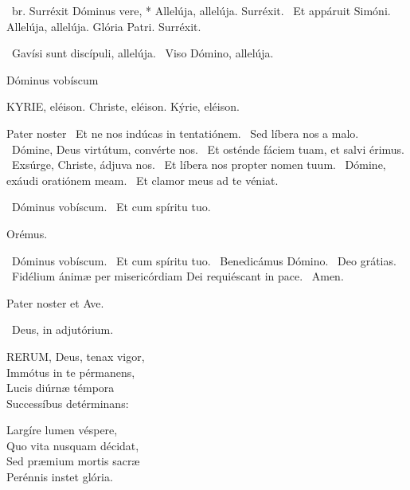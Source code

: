 \R\ br. Surréxit Dóminus vere, * Allelúja, allelúja. Surréxit. \V\ Et appáruit Simóni. Allelúja, allelúja. Glória Patri. Surréxit.

\V\ Gavísi sunt discípuli, allelúja. \R\ Viso Dómino, allelúja.

 Dóminus vobíscum 


KYRIE, eléison. Christe, eléison. Kýrie, eléison.

Pater noster  \V\ Et ne nos indúcas in tentatiónem. \R\ Sed líbera nos a malo. \V\ Dómine, Deus virtútum, convérte nos. \R\ Et osténde fáciem tuam, et salvi érimus. \V\ Exsúrge, Christe, ádjuva nos. \R\ Et líbera nos propter nomen tuum. \V\ Dómine, exáudi oratiónem meam. \R\ Et clamor meus ad te véniat.


\V\ Dóminus vobíscum. \R\ Et cum spíritu tuo.

Orémus.



\V\ Dóminus vobíscum. \R\ Et cum spíritu tuo. \V\ Benedicámus Dómino. \R\ Deo grátias. \V\ Fidélium ánimæ per misericórdiam Dei requiéscant in pace. \R\ Amen.



Pater noster et Ave.

\V\ Deus, in adjutórium.


\lettrine[lines=2]{R}{ERUM}, Deus, tenax vigor,\\
Immótus in te pérmanens,\\
Lucis diúrnæ témpora\\
Successíbus detérminans:

Largíre lumen véspere,\\
Quo vita nusquam décidat,\\
Sed præmium mortis sacræ\\
Perénnis instet glória.

